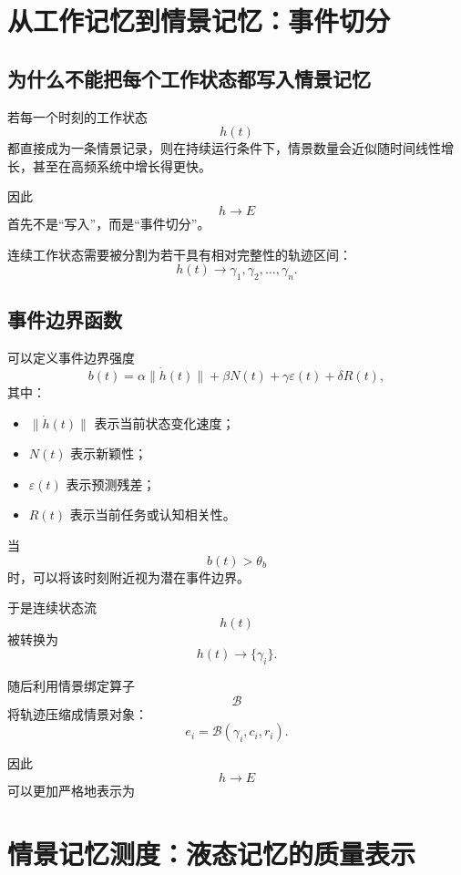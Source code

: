 \section{从工作记忆到情景记忆：事件切分}

\subsection{为什么不能把每个工作状态都写入情景记忆}

若每一个时刻的工作状态
\[
h(t)
\]
都直接成为一条情景记录，则在持续运行条件下，情景数量会近似随时间线性增长，甚至在高频系统中增长得更快。

因此
\[
h\rightarrow E
\]
首先不是“写入”，而是“事件切分”。

连续工作状态需要被分割为若干具有相对完整性的轨迹区间：
\[
h(t)
\longrightarrow
\gamma_1,\gamma_2,\ldots,\gamma_n.
\]

\subsection{事件边界函数}

可以定义事件边界强度
\[
b(t)
=
\alpha
\|\dot h(t)\|
+
\beta N(t)
+
\gamma \varepsilon(t)
+
\delta R(t),
\]
其中：

\begin{itemize}
    \item $\|\dot h(t)\|$ 表示当前状态变化速度；
    \item $N(t)$ 表示新颖性；
    \item $\varepsilon(t)$ 表示预测残差；
    \item $R(t)$ 表示当前任务或认知相关性。
\end{itemize}

当
\[
b(t)>\theta_b
\]
时，可以将该时刻附近视为潜在事件边界。

于是连续状态流
\[
h(t)
\]
被转换为
\[
\boxed{
h(t)
\rightarrow
\{\gamma_i\}.
}
\]

随后利用情景绑定算子
\[
\mathcal{B}
\]
将轨迹压缩成情景对象：
\[
\boxed{
e_i
=
\mathcal{B}(\gamma_i,c_i,r_i).
}
\]

因此
\[
h\rightarrow E
\]
可以更加严格地表示为
\begin{statementbox}
\centering
{}
\end{statementbox}

\section{情景记忆测度：液态记忆的质量表示}

